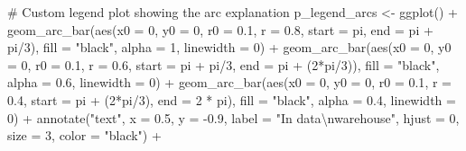 \documentclass[
  letterpaper,
  DIV=11,
  numbers=noendperiod]{scrartcl}
\newenvironment{Shaded}{\begin{snugshade}}{\end{snugshade}}
\newcommand{\AttributeTok}[1]{\textcolor[rgb]{0.40,0.45,0.13}{#1}}
\newcommand{\CommentTok}[1]{\textcolor[rgb]{0.37,0.37,0.37}{#1}}
\newcommand{\DecValTok}[1]{\textcolor[rgb]{0.68,0.00,0.00}{#1}}
\newcommand{\FloatTok}[1]{\textcolor[rgb]{0.68,0.00,0.00}{#1}}
\newcommand{\FunctionTok}[1]{\textcolor[rgb]{0.28,0.35,0.67}{#1}}
\newcommand{\NormalTok}[1]{\textcolor[rgb]{0.00,0.23,0.31}{#1}}
\newcommand{\OtherTok}[1]{\textcolor[rgb]{0.00,0.23,0.31}{#1}}
\newcommand{\SpecialCharTok}[1]{\textcolor[rgb]{0.37,0.37,0.37}{#1}}
\newcommand{\StringTok}[1]{\textcolor[rgb]{0.13,0.47,0.30}{#1}}
\begin{document}
\begin{Shaded}
\begin{Highlighting}[]
\CommentTok{\# Custom legend plot showing the arc explanation}
\NormalTok{p\_legend\_arcs }\OtherTok{\textless{}{-}} \FunctionTok{ggplot}\NormalTok{() }\SpecialCharTok{+}
    \FunctionTok{geom\_arc\_bar}\NormalTok{(}\FunctionTok{aes}\NormalTok{(}\AttributeTok{x0 =} \DecValTok{0}\NormalTok{, }\AttributeTok{y0 =} \DecValTok{0}\NormalTok{, }\AttributeTok{r0 =} \FloatTok{0.1}\NormalTok{, }\AttributeTok{r =} \FloatTok{0.8}\NormalTok{, }\AttributeTok{start =}\NormalTok{ pi, }\AttributeTok{end =}\NormalTok{ pi }\SpecialCharTok{+}\NormalTok{ pi}\SpecialCharTok{/}\DecValTok{3}\NormalTok{),}
             \AttributeTok{fill =} \StringTok{"black"}\NormalTok{, }\AttributeTok{alpha =} \DecValTok{1}\NormalTok{, }\AttributeTok{linewidth =} \DecValTok{0}\NormalTok{) }\SpecialCharTok{+}
    \FunctionTok{geom\_arc\_bar}\NormalTok{(}\FunctionTok{aes}\NormalTok{(}\AttributeTok{x0 =} \DecValTok{0}\NormalTok{, }\AttributeTok{y0 =} \DecValTok{0}\NormalTok{, }\AttributeTok{r0 =} \FloatTok{0.1}\NormalTok{, }\AttributeTok{r =} \FloatTok{0.6}\NormalTok{, }\AttributeTok{start =}\NormalTok{ pi }\SpecialCharTok{+}\NormalTok{ pi}\SpecialCharTok{/}\DecValTok{3}\NormalTok{, }\AttributeTok{end =}\NormalTok{ pi }\SpecialCharTok{+}\NormalTok{ (}\DecValTok{2}\SpecialCharTok{*}\NormalTok{pi}\SpecialCharTok{/}\DecValTok{3}\NormalTok{)),}
             \AttributeTok{fill =} \StringTok{"black"}\NormalTok{, }\AttributeTok{alpha =} \FloatTok{0.6}\NormalTok{, }\AttributeTok{linewidth =} \DecValTok{0}\NormalTok{) }\SpecialCharTok{+}
    \FunctionTok{geom\_arc\_bar}\NormalTok{(}\FunctionTok{aes}\NormalTok{(}\AttributeTok{x0 =} \DecValTok{0}\NormalTok{, }\AttributeTok{y0 =} \DecValTok{0}\NormalTok{, }\AttributeTok{r0 =} \FloatTok{0.1}\NormalTok{, }\AttributeTok{r =} \FloatTok{0.4}\NormalTok{, }\AttributeTok{start =}\NormalTok{ pi }\SpecialCharTok{+}\NormalTok{ (}\DecValTok{2}\SpecialCharTok{*}\NormalTok{pi}\SpecialCharTok{/}\DecValTok{3}\NormalTok{), }\AttributeTok{end =} \DecValTok{2} \SpecialCharTok{*}\NormalTok{ pi),}
             \AttributeTok{fill =} \StringTok{"black"}\NormalTok{, }\AttributeTok{alpha =} \FloatTok{0.4}\NormalTok{, }\AttributeTok{linewidth =} \DecValTok{0}\NormalTok{) }\SpecialCharTok{+}
    \FunctionTok{annotate}\NormalTok{(}\StringTok{"text"}\NormalTok{, }
             \AttributeTok{x =} \FloatTok{0.5}\NormalTok{, }\AttributeTok{y =} \SpecialCharTok{{-}}\FloatTok{0.9}\NormalTok{,}
             \AttributeTok{label =} \StringTok{"In data}\SpecialCharTok{\textbackslash{}n}\StringTok{warehouse"}\NormalTok{, }
             \AttributeTok{hjust =} \DecValTok{0}\NormalTok{, }\AttributeTok{size =} \DecValTok{3}\NormalTok{, }\AttributeTok{color =} \StringTok{"black"}\NormalTok{) }\SpecialCharTok{+}

\end{Highlighting}
\end{Shaded}
\end{document}
